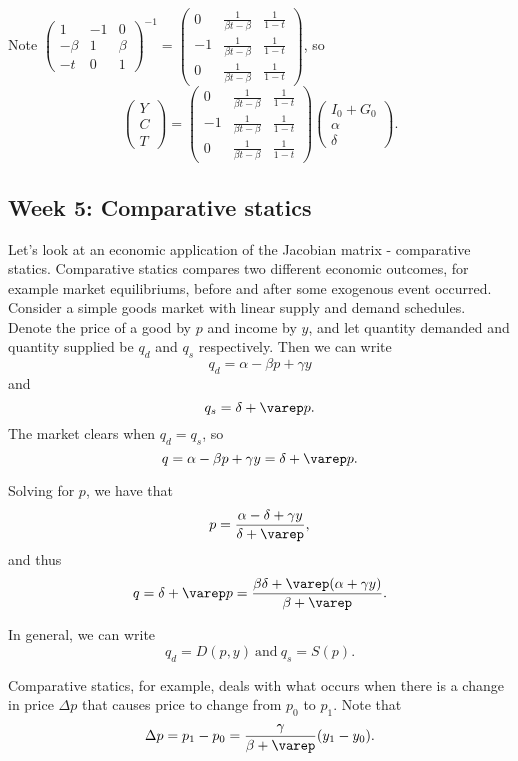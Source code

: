 \documentclass[a4paper, 12pt,oneside,openany]{book}
\begin{document}
Note $\begin{pmatrix} 1 & -1 & 0 \\ -\beta & 1 & \beta \\ -t & 0 & 1\end{pmatrix}^{-1}  = \begin{pmatrix} 0 & \frac{1}{\beta t-\beta} & \frac{1}{1-t} \\ -1 & \frac{1}{\beta t-\beta} & \frac{1}{1-t} \\ 0 & \frac{1}{\beta t-\beta} & \frac{1}{1-t}\end{pmatrix}$, so  $$\begin{pmatrix} Y\\C\\T \end{pmatrix} = \begin{pmatrix} 0 & \frac{1}{\beta t-\beta} & \frac{1}{1-t} \\ -1 & \frac{1}{\beta t-\beta} & \frac{1}{1-t} \\ 0 & \frac{1}{\beta t-\beta} & \frac{1}{1-t}\end{pmatrix} \begin{pmatrix} I_0+G_0 \\ \alpha \\ \delta \end{pmatrix}.$$

\subsection{Week 5: Comparative statics}

Let's look at an economic application of the Jacobian matrix - comparative statics. Comparative statics compares two different economic outcomes, for example market equilibriums, before and after some exogenous event occurred. Consider a simple goods market with linear supply and demand schedules. Denote the price of a good by $p$ and income by $y$, and let quantity demanded and quantity supplied be $q_d$ and $q_s$ respectively. Then we can write $$q_d = \alpha - \beta p + \gamma y$$ and $$q_s = \delta + \varep p.$$ The market clears when $q_d=q_s$, so $$q=\alpha - \beta p + \gamma y=\delta + \varep p.$$

Solving for $p$, we have that $$p=\frac{\alpha-\delta+\gamma y}{\delta +\varep},$$ and thus $$q = \delta+\varep p = \frac{\beta\delta+\varep(\alpha+\gamma y)}{\beta+\varep}.$$ 

In general, we can write $$q_d=D(p, y)\ \text{and}\ q_s=S(p).$$

Comparative statics, for example, deals with what occurs when there is a change in price $\Delta p$ that causes price to change from $p_0$ to $p_1$. Note that $$\Delta p = p_1-p_0 = \frac{\gamma}{\beta+\varep}(y_1-y_0).$$
\end{document}
